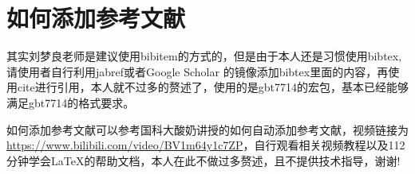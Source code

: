 \chapter{如何添加参考文献}

\par 其实刘梦良老师是建议使用bibitem的方式的，但是由于本人还是习惯使用bibtex,请使用者自行利用jabref或者Google  Scholar 的镜像添加bibtex里面的内容，再使用cite进行引用，本人就不过多的赘述了\cite{朱建章2016遥感大数据研究现状与发展趋势}，使用的是gbt7714的宏包，基本已经能够满足gbt7714的格式要求\cite{lary2016machine}。

\par 如何添加参考文献可以参考国科大酸奶讲授的如何自动添加参考文献，视频链接为\\ \href{https://www.bilibili.com/video/BV1m64y1c7ZP}{https://www.bilibili.com/video/BV1m64y1c7ZP}，自行观看相关视频教程以及112分钟学会\LaTeX 的帮助文档，本人在此不做过多赘述，且不提供技术指导，谢谢!